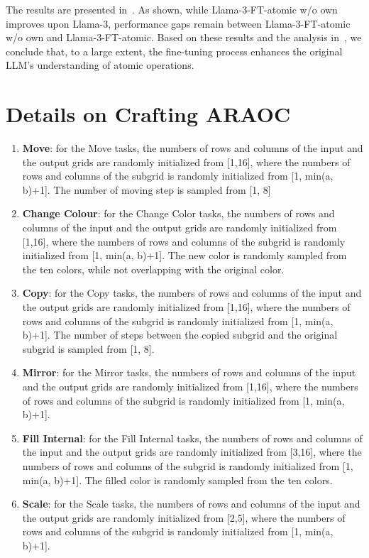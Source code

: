 The results are presented in~. As shown, while Llama-3-FT-atomic w/o own improves upon Llama-3, performance gaps remain between Llama-3-FT-atomic w/o own and Llama-3-FT-atomic. Based on these results and the analysis in~, we conclude that, to a large extent, the fine-tuning process enhances the original LLM's understanding of atomic operations.


\section{Details on Crafting ARAOC}
\label{appendix:araoc}
\begin{enumerate}
    \item \textbf{Move}: for the Move tasks, the numbers of rows and columns of the input and the output grids are randomly initialized from [1,16], where the numbers of rows and columns of the subgrid is randomly initialized from [1, min(a, b)+1]. The number of moving step is sampled from [1, 8]
       \item \textbf{Change Colour}: for the Change Color tasks, the numbers of rows and columns of the input and the output grids are randomly initialized from [1,16], where the numbers of rows and columns of the subgrid is randomly initialized from [1, min(a, b)+1]. The new color is randomly sampled from the ten colors, while not overlapping with the original color.
   \item \textbf{Copy}: for the Copy tasks, the numbers of rows and columns of the input and the output grids are randomly initialized from [1,16], where the numbers of rows and columns of the subgrid is randomly initialized from [1, min(a, b)+1]. The number of steps between the copied subgrid and the original subgrid is sampled from [1, 8].
   \item \textbf{Mirror}: for the Mirror tasks, the numbers of rows and columns of the input and the output grids are randomly initialized from [1,16], where the numbers of rows and columns of the subgrid is randomly initialized from [1, min(a, b)+1]. 
   \item \textbf{Fill Internal}: for the Fill Internal tasks, the numbers of rows and columns of the input and the output grids are randomly initialized from [3,16], where the numbers of rows and columns of the subgrid is randomly initialized from [1, min(a, b)+1]. The filled color is randomly sampled from the ten colors.
\item \textbf{Scale}: for the Scale tasks, the numbers of rows and columns of the input and the output grids are randomly initialized from [2,5], where the numbers of rows and columns of the subgrid is randomly initialized from [1, min(a, b)+1]. 
\end{enumerate}

